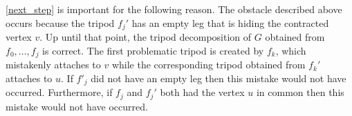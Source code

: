 \documentclass{patmorin}
\begin{document}
\cref{next_step} is important for the following reason.  The obstacle described above occurs because the tripod $f_{j}'$ has an empty leg that is hiding the contracted vertex $v$.  Up until that point, the tripod decomposition of $G$ obtained from $f_0,\ldots,f_j$ is correct.  The first problematic tripod is created by $f_k$, which mistakenly attaches to $v$ while the corresponding tripod obtained from $f_k'$ attaches to $u$.  If $f'_j$ did not have an empty leg then this mistake would not have occurred.  Furthermore, if $f_j$ and $f_j'$ both had the vertex $u$ in common then this mistake would not have occurred.








\end{document}
